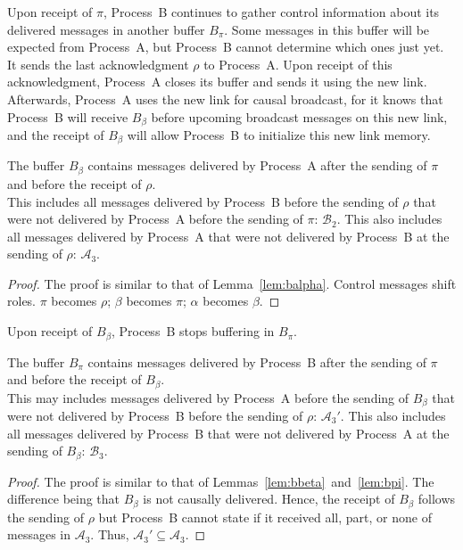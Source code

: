 Upon receipt of $\pi$, Process~B continues to gather control information about
its delivered messages in another buffer $B_\pi$. Some messages in this buffer
will be expected from Process~A, but Process~B cannot determine which ones just
yet. It sends the last acknowledgment $\rho$ to Process~A. Upon receipt of this
acknowledgment, Process~A closes its buffer and sends it using the new
link. Afterwards, Process~A uses the new link for causal broadcast, for it knows
that Process~B will receive $B_\beta$ before upcoming broadcast messages on this
new link, and the receipt of $B_\beta$ will allow Process~B to initialize this
new link memory.


\begin{lemma}
  The buffer $B_\beta$ contains messages delivered by Process~A after the
  sending of $\pi$ and before the receipt of $\rho$.\\
  This includes all messages delivered by Process~B before the sending of
  $\rho$ that were not delivered by Process~A before the sending of $\pi$:
  $\mathcal{B}_2$. This also includes all messages delivered by Process~A that
  were not delivered by Process~B at the sending of $\rho$: $\mathcal{A}_3$.
\end{lemma}
  
\begin{proof}
  The proof is similar to that of Lemma~\ref{lem:balpha}. Control messages
  shift roles. $\pi$ becomes $\rho$; $\beta$ becomes $\pi$; $\alpha$ becomes
  $\beta$.
\end{proof}

Upon receipt of $B_\beta$, Process~B stops buffering in $B_\pi$.
  
\begin{lemma}
  The buffer $B_\pi$ contains messages delivered by Process~B after the
  sending of $\pi$ and before the receipt of $B_\beta$.\\
  This may includes messages delivered by Process~A before the sending of
  $B_\beta$ that were not delivered by Process~B before the sending of $\rho$:
  $\mathcal{A}_3'$. This also includes all messages delivered by Process~B that
  were not delivered by Process~A at the sending of $B_\beta$:
  $\mathcal{B}_3$. 
\end{lemma}

\begin{proof}
  The proof is similar to that of Lemmas~\ref{lem:bbeta}~and~\ref{lem:bpi}. The
  difference being that $B_\beta$ is not causally delivered. Hence, the receipt
  of $B_\beta$ follows the sending of $\rho$ but Process~B cannot state if it
  received all, part, or none of messages in $\mathcal{A}_3$. Thus,
  $\mathcal{A}_3' \subseteq \mathcal{A}_3$.
\end{proof}

